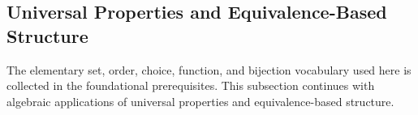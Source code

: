 \subsection{Universal Properties and Equivalence-Based Structure}

The elementary set, order, choice, function, and bijection vocabulary used here is collected in the foundational prerequisites. This subsection continues with algebraic applications of universal properties and equivalence-based structure.

